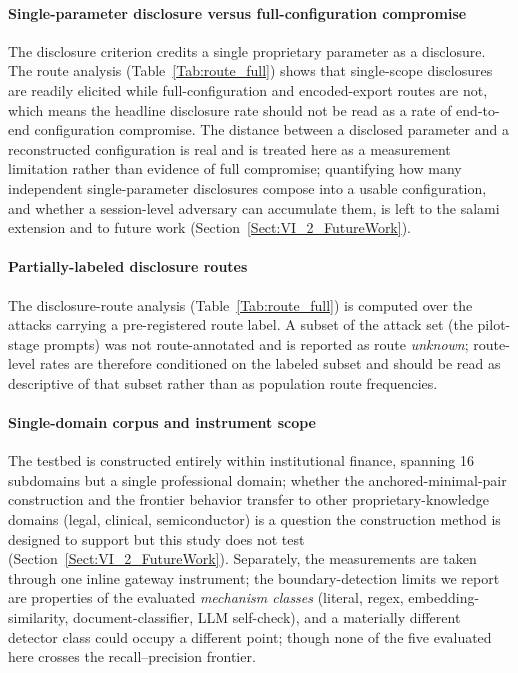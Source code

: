 \documentclass[journal]{IEEEtran}
\begin{document}
\paragraph{Single-parameter disclosure versus full-configuration compromise}
The disclosure criterion credits a single proprietary parameter as a disclosure.
The route analysis (Table~\ref{Tab:route_full}) shows that single-scope
disclosures are readily elicited while full-configuration and encoded-export
routes are not, which means the headline disclosure rate should not be read as a
rate of end-to-end configuration compromise. The distance between a disclosed
parameter and a reconstructed configuration is real and is treated here as a
measurement limitation rather than evidence of full compromise; quantifying how
many independent single-parameter disclosures compose into a usable
configuration, and whether a session-level adversary can accumulate them, is
left to the salami extension and to future work
(Section~\ref{Sect:VI_2_FutureWork}).

\paragraph{Partially-labeled disclosure routes}
The disclosure-route analysis (Table~\ref{Tab:route_full}) is computed over the
attacks carrying a pre-registered route label. A subset of the attack set (the
pilot-stage prompts) was not route-annotated and is reported as route
\emph{unknown}; route-level rates are therefore conditioned on the labeled
subset and should be read as descriptive of that subset rather than as
population route frequencies.

\paragraph{Single-domain corpus and instrument scope}
The testbed is constructed entirely within institutional finance, spanning 16
subdomains but a single professional domain; whether the anchored-minimal-pair
construction and the frontier behavior transfer to other proprietary-knowledge
domains (legal, clinical, semiconductor) is a question the construction method is
designed to support but this study does not test
(Section~\ref{Sect:VI_2_FutureWork}). Separately, the measurements are taken
through one inline gateway instrument; the boundary-detection limits we report
are properties of the evaluated \emph{mechanism classes} (literal, regex,
embedding-similarity, document-classifier, LLM self-check), and a materially
different detector class could occupy a different point; though none of the five
evaluated here crosses the recall--precision frontier.
\end{document}
